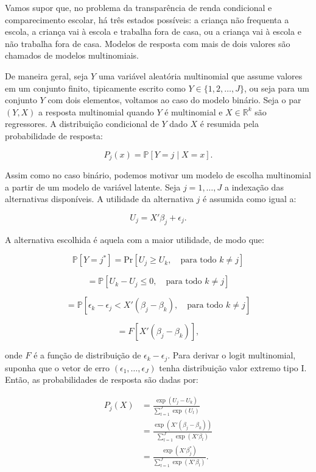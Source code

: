 \documentclass[12pt, a4paper, openany]{book}
\numberwithin{equation}{chapter}
\numberwithin{table}{chapter}
\numberwithin{figure}{chapter}
\theoremstyle{break}
\newcommand{\Pb}{\mathbb{P}}
\begin{document}
Vamos supor que, no problema da transparência de renda condicional e comparecimento escolar, há três estados possíveis: a criança não frequenta a escola, a criança vai à escola e trabalha fora de casa, ou a criança vai à escola e não trabalha fora de casa. Modelos de resposta com mais de dois valores são chamados de modelos multinomiais.

De maneira geral, seja \( Y \) uma variável aleatória multinomial que assume valores em um conjunto finito, tipicamente escrito como \( Y \in \{1,2,\dots,J\} \), ou seja para um conjunto $Y$ com dois elementos, voltamos ao caso do modelo binário. Seja o par \( (Y, {X}) \) a resposta multinomial quando \( Y \) é multinomial e \( {X} \in \mathbb{R}^k \) são regressores. A distribuição condicional de \( Y \) dado \( {X} \) é resumida pela probabilidade de resposta:

\[
P_j(x) = \Pb[Y = j \mid {X} = x].
\]

Assim como no caso binário, podemos motivar um modelo de escolha multinomial a partir de um modelo de variável latente. Seja \( j = 1, \dots, J \) a indexação das alternativas disponíveis. A utilidade da alternativa \( j \) é assumida como igual a:

\[
U_j = {X}' {\beta}_j + \epsilon_j.
\]

A alternativa escolhida é aquela com a maior utilidade, de modo que:

\[
\Pb[Y = j^*] = \text{Pr}[U_j \geq U_k, \quad \text{para todo } k \neq j]
\]

\[
= \Pb[U_k - U_j \leq 0, \quad \text{para todo } k \neq j]
\]

\[
= \Pb \left[ \epsilon_k - \epsilon_j < {X}' ({\beta}_j - {\beta}_k), \quad \text{para todo } k \neq j \right]
\]

\[
= F \left[ {X}' ({\beta}_j - {\beta}_k) \right],
\]

onde \( F \) é a função de distribuição de \( \epsilon_k - \epsilon_j \). Para derivar o logit multinomial, suponha que o vetor de erro \( (\epsilon_1, \dots, \epsilon_J) \) tenha distribuição valor extremo tipo I. Então, as probabilidades de resposta são dadas por:

\begin{align*}
    P_j({X}) &= \frac{\exp\left( U_j - U_k\right)}{\sum_{l=1}^{J} \exp\left( U_l \right)} \\
     &= \frac{\exp\left( {X}' ({\beta}_j - {\beta}_k) \right)}{\sum_{l=1}^{J} \exp\left( {X}' {\beta}_l \right)} \\
     &= \frac{\exp\left( {X}' {\beta}_j^* \right)}{\sum_{l=1}^{J} \exp\left( {X}' {\beta}_l \right)}.
\end{align*}
\end{document}
